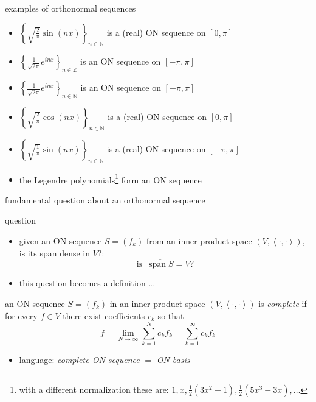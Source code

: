 \documentclass[10pt,
               svgnames,
               hyperref={colorlinks,
                         citecolor=DeepPink4,
                         linkcolor=FireBrick,
                         urlcolor=blue},
               usepdftitle=false]{beamer}
\newcommand{\NN}{\mathbb{N}}
\newcommand{\ZZ}{\mathbb{Z}}
\newcommand{\Span}{\operatorname{span}}
\newcommand{\ds}{\displaystyle}
\newcommand{\ip}[2]{\left<#1,#2\right>}
\begin{document}
\begin{frame}{examples of orthonormal sequences}

{\small
\begin{itemize}
\item $\ds \left\{\sqrt{\frac{2}{\pi}} \sin(nx)\right\}_{n\in\NN}$ is a (real) ON sequence on $[0,\pi]$ 
\item $\ds \left\{\frac{1}{\sqrt{2\pi}} e^{inx}\right\}_{n\in\ZZ}$ is an ON sequence on $[-\pi,\pi]$ 
\item $\ds \left\{\frac{1}{\sqrt{2\pi}} e^{inx}\right\}_{n\in\NN}$ is an ON sequence on $[-\pi,\pi]$ 
\item $\ds \left\{\sqrt{\frac{2}{\pi}} \cos(nx)\right\}_{n\in\NN}$ is a (real) ON sequence on $[0,\pi]$ 
\item $\ds \left\{\sqrt{\frac{1}{\pi}} \sin(nx)\right\}_{n\in\NN}$ is a (real) ON sequence on $[-\pi,\pi]$ 
\item the Legendre polynomials\footnote{with a different normalization these are:  $1,x,\frac{1}{2}(3x^2-1),\frac{1}{2}(5x^3-3x),\dots$} form an ON sequence 
\end{itemize}
}
\end{frame}


\begin{frame}{fundamental question about an orthonormal sequence}

\begin{block}{question}
\begin{itemize}
\item given an ON sequence $S=(f_k)$ from an inner product space $(V,\ip{\cdot}{\cdot})$, is its span dense in $V$?:
    $$\text{is }\,\ds \overline{\Span S} = V?$$
\end{itemize}
\end{block}

\begin{itemize}
\item this question becomes a definition \dots
\end{itemize}

\begin{definition}
an ON sequence $S=(f_k)$ in an inner product space $(V,\ip{\cdot}{\cdot})$ is \emph{complete} if for every $f\in V$ there exist coefficients $c_k$ so that
	$$f = \lim_{N\to\infty} \sum_{k=1}^N c_k f_k = \sum_{k=1}^\infty c_k f_k$$
\end{definition}

\begin{itemize}
\item language: \emph{complete ON sequence} $=$ \emph{ON basis}
\end{itemize}
\end{frame}
\end{document}
